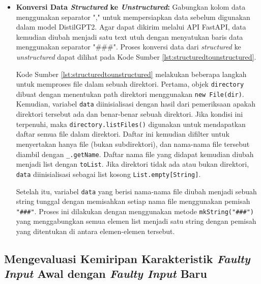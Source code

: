 \begin{itemize}
  \item \textbf{Konversi Data \emph{Structured} ke \emph{Unstructured}:} Gabungkan kolom data menggunakan separator "," untuk mempersiapkan data sebelum digunakan dalam model DistilGPT2.
  Agar dapat dikirim melalui API FastAPI, data kemudian diubah menjadi satu text utuh dengan
  menyatukan baris data menggunakan separator "\#\#\#".
  Proses konversi data dari \emph{structured} ke \emph{unstructured} dapat dilihat pada Kode Sumber \ref{lst:structuredtounstructured}.

  

  Kode Sumber \ref{lst:structuredtounstructured} melakukan beberapa langkah untuk memproses file dalam sebuah direktori. Pertama, objek \texttt{directory} dibuat dengan menentukan path direktori menggunakan \texttt{new File(dir)}. Kemudian, variabel \texttt{data} diinisialisasi dengan hasil dari pemeriksaan apakah direktori tersebut ada dan benar-benar sebuah direktori. Jika kondisi ini terpenuhi, maka \texttt{directory.listFiles()} digunakan untuk mendapatkan daftar semua file dalam direktori. Daftar ini kemudian difilter untuk menyertakan hanya file (bukan subdirektori), dan nama-nama file tersebut diambil dengan \texttt{\_.getName}. Daftar nama file yang didapat kemudian diubah menjadi list dengan \texttt{toList}. Jika direktori tidak ada atau bukan direktori, \texttt{data} diinisialisasi sebagai list kosong \texttt{List.empty[String]}.

  Setelah itu, variabel \texttt{data} yang berisi nama-nama file diubah menjadi sebuah string tunggal dengan memisahkan setiap nama file menggunakan pemisah \texttt{"\#\#\#"}. Proses ini dilakukan dengan menggunakan metode \texttt{mkString("\#\#\#")} yang menggabungkan semua elemen list menjadi satu string dengan pemisah yang ditentukan di antara elemen-elemen tersebut.


\end{itemize}

\subsection{Mengevaluasi Kemiripan Karakteristik 
\emph{Faulty Input} Awal dengan \emph{Faulty Input} Baru}
\label{sec:mengevaluasikemiripan}

